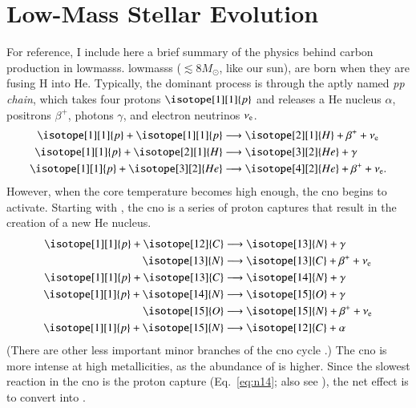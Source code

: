 \documentclass[12pt,oneside,letterpaper]{report}
\newcommand{\proton}{\isotope[1][1]{p}}
\begin{document}
\newpage
\chapter{Low-Mass Stellar Evolution}\label{sec:stel_evo}
For reference, I include here a brief summary of the physics behind carbon production in \glspl{lowmass}.
\Glspl{lowmass} ($\lesssim 8 M_\odot$, like our sun), are born when they are fusing H into He. Typically, the dominant process is through the aptly named \textit{pp chain}, which takes four protons $\proton$ and releases a He nucleus $\alpha$, positrons $\beta^{+}$, photons $\gamma$, and electron neutrinos $\nu_{\rm e}$.
\begin{subequations}
    \begin{align}
        \proton + \proton &\longrightarrow \isotope[2][1]{H} + \beta^+ + \nu_{\rm e} \\
        \proton + \isotope[2][1]{H} &\longrightarrow \isotope[3][2]{He} + \gamma\\
        \proton + \isotope[3][2]{He} &\longrightarrow \isotope[4][2]{He} + \beta^+ + \nu_{\rm e}.
    \end{align}
\end{subequations}
However, when the core temperature becomes high enough, the \gls{cno} begins to activate. Starting with , the \gls{cno} is a series of proton captures that result in the creation of a new He nucleus.
\begin{subequations}\label{eq:cno_cycle}
\begin{align}
    \proton + \isotope[12]{C} &\longrightarrow \isotope[13]{N} + \gamma \\
    \isotope[13]{N} &\longrightarrow  \isotope[13]{C} + \beta^+ + \nu_{\rm e}  \\
    \proton + \isotope[13]{C}  &\longrightarrow \isotope[14]{N} + \gamma\\
    \proton + \isotope[14]{N}  &\longrightarrow \isotope[15]{O} + \gamma \label{eq:n14}\\
    \isotope[15]{O} &\longrightarrow  \isotope[15]{N} + \beta^{+} + \nu_{\rm e} \\
    \proton + \isotope[15]{N} &\longrightarrow \isotope[12]{C} + \alpha
\end{align}
\end{subequations}
(There are other less important minor branches of the \gls{cno} cycle
 \citep{solar-fusion}.)
The \gls{cno} is more intense at high metallicities, as the abundance of  is higher. Since the slowest reaction in the \gls{cno} is the  proton capture (Eq.~\ref{eq:n14}; also see \citealt{solar-fusion}), the net effect is to convert  into . 
\end{document}
